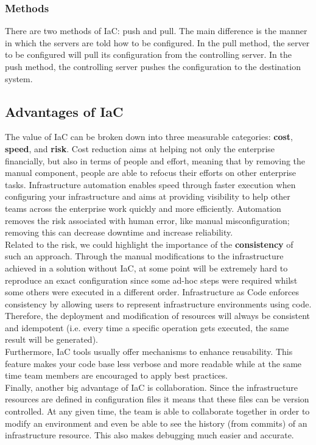 \subsubsection{Methods}

There are two methods of IaC: push and pull.
The main difference is the manner in which the servers are told how to be configured.
In the pull method, the server to be configured will pull its configuration from the controlling server.
In the push method, the controlling server pushes the configuration to the destination system.

\subsection{Advantages of IaC}

The value of IaC can be broken down into three measurable categories: \textbf{cost}, \textbf{speed}, and \textbf{risk}.
Cost reduction aims at helping not only the enterprise financially, but also in terms of people and effort, meaning that by removing the manual component, people are able to refocus their efforts on other enterprise tasks.
Infrastructure automation enables speed through faster execution when configuring your infrastructure and aims at providing visibility to help other teams across the enterprise work quickly and more efficiently.
Automation removes the risk associated with human error, like manual misconfiguration; removing this can decrease downtime and increase reliability.\\
Related to the risk, we could highlight the importance of the \textbf{consistency} of such an approach.
Through the manual modifications to the infrastructure achieved in a solution without IaC, at some point will be extremely hard to reproduce an exact configuration since some ad-hoc steps were required
whilst some others were executed in a different order.
Infrastructure as Code enforces consistency by allowing users to represent infrastructure environments using code.
Therefore, the deployment and modification of resources will always be consistent and idempotent (i.e. every time a specific operation gets executed, the same result will be generated).\\
Furthermore, IaC tools usually offer mechanisms to enhance reusability.
This feature makes your code base less verbose and more readable while at the same time team members are encouraged to apply best practices.\\
Finally, another big advantage of IaC is collaboration.
Since the infrastructure resources are defined in configuration files it means that these files can be version controlled.
At any given time, the team is able to collaborate together in order to modify an environment and even be able to see the history (from commits) of an infrastructure resource.
This also makes debugging much easier and accurate.


